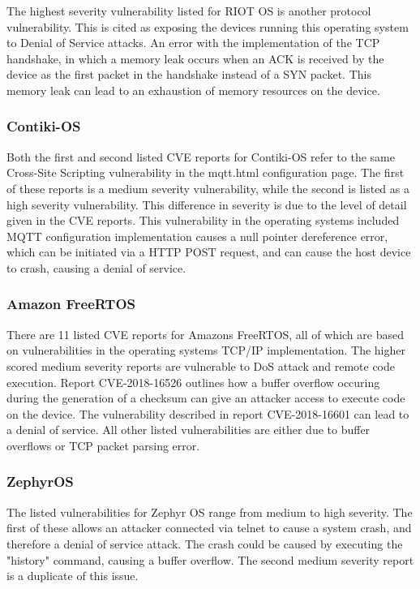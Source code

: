 The highest severity vulnerability listed for RIOT OS is another protocol
vulnerability. This is cited as exposing the devices running this operating
system to Denial of Service attacks. An error with the implementation of the TCP
handshake, in which a memory leak occurs when an ACK is received by the device
as the first packet in the handshake instead of a SYN packet\cite{riotCve3}. This memory leak
can lead to an exhaustion of memory resources on the device.

\subsubsection{\textbf{Contiki-OS}}

Both the first and second listed CVE reports for Contiki-OS refer to the same
Cross-Site Scripting vulnerability in the mqtt.html configuration page. The
first of these reports is a medium severity vulnerability\cite{contikiCve1},
while the second is listed as a high severity vulnerability\cite{contikiCve2}.
This difference in severity is due to the level of detail given in the CVE
reports. This vulnerability in the operating systems included MQTT configuration
implementation causes a null pointer dereference error, which can be initiated
via a HTTP POST request, and can cause the host device to crash, causing a denial of
service\cite{contikiMqtt}.

\subsubsection{\textbf{Amazon FreeRTOS}}

There are 11 listed CVE reports for Amazons FreeRTOS\cite{awsCve}, all of which are based on
vulnerabilities in the operating systems TCP/IP implementation. The higher
scored medium severity reports are vulnerable to DoS attack and remote code
execution. Report CVE-2018-16526\cite{awsCve1} outlines how a buffer overflow occuring during
the generation of a checksum can give an attacker access to execute code on the
device. The vulnerability described in report CVE-2018-16601\cite{awsCve2} can
lead to a denial of service. All other listed vulnerabilities are either due to
buffer overflows or TCP packet parsing error.

\subsubsection{\textbf{ZephyrOS}}

The listed vulnerabilities for Zephyr OS range from medium to high
severity\cite{zepCve}. The first of these allows an attacker connected via
telnet to cause a system crash, and therefore a denial of service attack. The
crash could be caused by executing the "history" command, causing a buffer
overflow\cite{zepCVe1}. The second medium severity report is a duplicate of this
issue.

